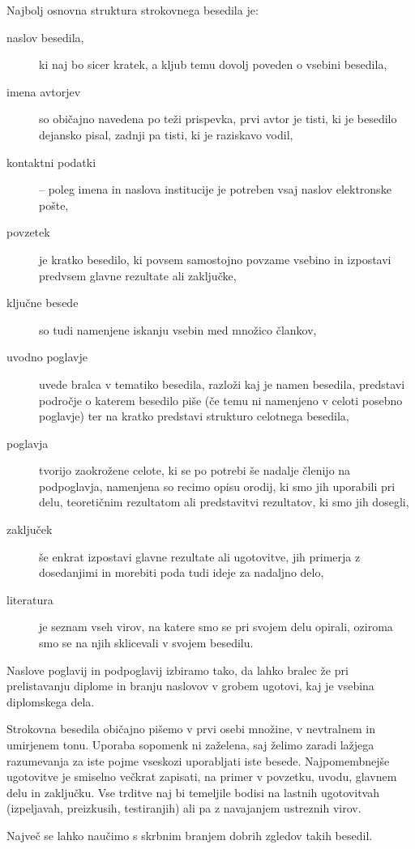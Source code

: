\documentclass[a4paper,12pt,openright]{book}
\begin{document}
Najbolj osnovna struktura strokovnega besedila je:
\begin{description}
	\item[naslov besedila,] ki naj bo sicer kratek, a kljub temu dovolj poveden o vsebini besedila,
	\item[imena avtorjev] so običajno navedena po teži prispevka, prvi avtor je tisti, ki je besedilo dejansko pisal, zadnji pa tisti, ki je raziskavo vodil,
	\item[kontaktni podatki] -- poleg imena in naslova institucije je potreben vsaj naslov elektronske pošte,
	\item[povzetek] je kratko besedilo, ki povsem samostojno povzame vsebino in izpostavi predvsem  glavne rezultate ali zaključke,
	\item[ključne besede] so tudi namenjene iskanju vsebin med množico člankov,
	\item[uvodno poglavje] uvede bralca v tematiko besedila, razloži kaj je namen besedila, predstavi področje o katerem besedilo piše
	      (če temu ni namenjeno v celoti posebno poglavje) ter na kratko predstavi strukturo celotnega besedila,
	\item[poglavja] tvorijo zaokrožene celote, ki se po potrebi še nadalje členijo na podpoglavja, namenjena so recimo opisu orodij,
	      ki smo jih uporabili pri delu, teoretičnim rezultatom ali predstavitvi rezultatov, ki smo jih dosegli,
	\item[zaključek] še enkrat izpostavi glavne rezultate ali ugotovitve, jih primerja z dosedanjimi in morebiti poda tudi ideje za nadaljno delo,
	\item[literatura] je seznam vseh virov, na katere smo se pri svojem delu opirali, oziroma smo se na njih sklicevali v svojem besedilu.
\end{description}

Naslove poglavij in podpoglavij izbiramo tako, da lahko bralec že pri prelistavanju diplome in branju naslovov
v grobem ugotovi, kaj je vsebina diplomskega dela.

Strokovna besedila običajno pišemo v prvi osebi množine, v nevtralnem in umirjenem tonu.
Uporaba sopomenk ni zaželena, saj želimo zaradi lažjega razumevanja za iste pojme vseskozi uporabljati iste besede.
Najpomembnejše ugotovitve je smiselno večkrat zapisati, na primer v povzetku, uvodu, glavnem delu in zaključku.
Vse trditve naj bi temeljile bodisi na lastnih ugotovitvah (izpeljavah, preizkusih, testiranjih) ali pa z navajanjem ustreznih virov.

Največ se lahko naučimo s skrbnim branjem dobrih zgledov takih besedil.
\end{document}
